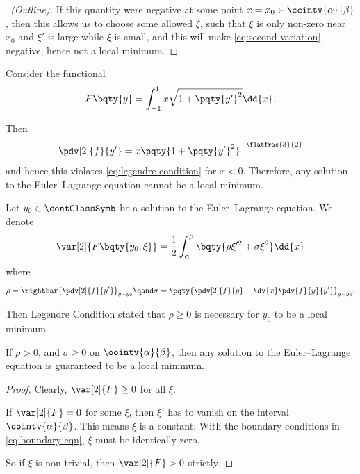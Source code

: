 \begin{proof}[\proofname\ (Outline)]
    If this quantity were negative at some point \(x = x_0 \in \ccintv{\alpha}{\beta}\), then this allows us to choose some allowed \(\xi\), such that \(\xi\) is only non-zero near \(x_0\) and \(\xi'\) is large while \(\xi\) is small, and this will make \eqref{eq:second-variation} negative, hence not a local minimum.
\end{proof}

\begin{example}
    Consider the functional
    \[
        F\bqty{y} = \int_{-1}^{1} x \sqrt{1 + \pqty{y'}^2} \dd{x}.
    \]

    Then
    \[
        \pdv[2]{f}{{y'}} = x \pqty{1 + \pqty{y'}^2}^{-\flatfrac{3}{2}}
    \]
    and hence this violates \eqref{eq:legendre-condition} for \(x < 0\). Therefore, any solution to the Euler--Lagrange equation cannot be a local minimum.
\end{example}

\begin{definition}
    Let \(y_0 \in \contClassSymb\) be a solution to the Euler--Lagrange equation. We denote
    \[
        \var[2]{F\bqty{y_0, \xi}} = \frac{1}{2} \int_{\alpha}^{\beta} \bqty{\rho \xi'^2 + \sigma \xi^2} \dd{x}
    \]
    where
    \begin{equation}
        \label{eq:second-variation-parameter}%
        \rho = \rightbar{\pdv[2]{f}{{y'}}}_{y = y_0} \qand \sigma = \pqty{\pdv[2]{f}{y} - \dv{x} \pdv{f}{y}{y'}}_{y = y_0}.
    \end{equation}
\end{definition}

Then Legendre Condition stated that \(\rho \geq 0\) is necessary for \(y_0\) to be a local minimum.

\begin{proposition}
    If \(\rho > 0\), and \(\sigma \geq 0\) on \(\oointv{\alpha}{\beta}\), then any solution to the Euler--Lagrange equation is guaranteed to be a local minimum.
\end{proposition}

\begin{proof}
    Clearly, \(\var[2]{F} \geq 0\) for all \(\xi\).
    
    If \(\var[2]{F} = 0\) for some \(\xi\), then \(\xi'\) has to vanish on the interval \(\oointv{\alpha}{\beta}\). This means \(\xi\) is a constant. With the boundary conditions in \eqref{eq:boundary-eqn}, \(\xi\) must be identically zero.

    So if \(\xi\) is non-trivial, then \(\var[2]{F} > 0\) strictly.
\end{proof}

